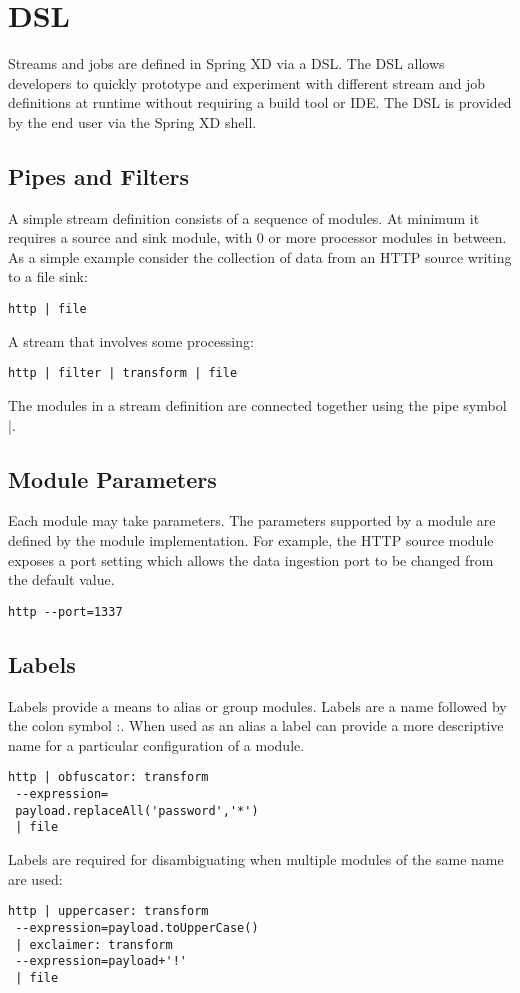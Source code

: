 \section{DSL}
\label{sec:DSL}
Streams and jobs are defined in Spring XD via a DSL\cite{dsl}. The DSL allows developers
to quickly prototype and experiment with different stream and job definitions at
runtime without requiring a build tool or IDE. The DSL is provided by the end user
via the Spring XD shell.

\subsection {Pipes and Filters}
A simple stream definition consists of a sequence of modules. At minimum it requires a
source and sink module, with 0 or more processor modules in between. As a simple example
consider the collection of data from an HTTP source writing to a file sink:

\begin{lstlisting}
http | file
\end{lstlisting}

A stream that involves some processing:

\begin{lstlisting}
http | filter | transform | file
\end{lstlisting}

The modules in a stream definition are connected together using the pipe symbol |.

\subsection{Module Parameters}
Each module may take parameters. The parameters supported by a module are defined by
the module implementation. For example, the HTTP source module exposes a port setting
which allows the data ingestion port to be changed from the default value.

\begin{lstlisting}
http --port=1337
\end{lstlisting}

\subsection{Labels}

Labels provide a means to alias or group modules. Labels are a name followed
by the colon symbol :. When used as an alias a label can provide a more descriptive
name for a particular configuration of a module.

\begin{lstlisting}
http | obfuscator: transform
 --expression=
 payload.replaceAll('password','*')
 | file
\end{lstlisting}

Labels are required for disambiguating when multiple modules of the same name are used:

\begin{lstlisting}
http | uppercaser: transform
 --expression=payload.toUpperCase()
 | exclaimer: transform 
 --expression=payload+'!'
 | file
\end{lstlisting}

